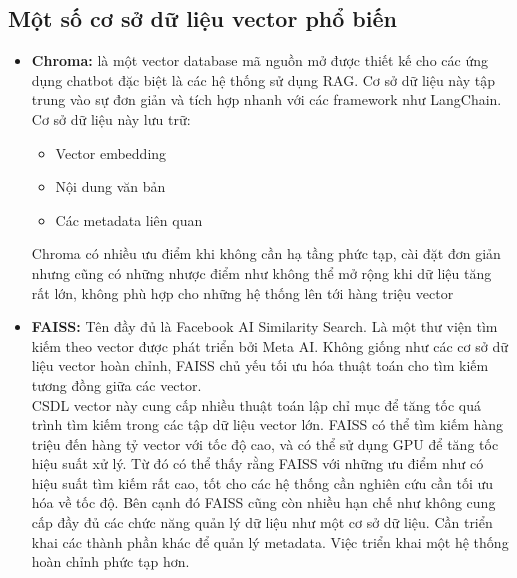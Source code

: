 \documentclass[../DoAn.tex]{subfiles}
\begin{document}
\subsection{Một số cơ sở dữ liệu vector phổ biến}
\begin{itemize}[label=-, leftmargin=*]
    \item \textbf{Chroma:} là một vector database mã nguồn mở được thiết kế cho các ứng dụng chatbot đặc biệt là các hệ thống sử dụng RAG. Cơ sở dữ liệu này tập trung vào sự đơn giản và tích hợp nhanh với các framework như LangChain. Cơ sở dữ liệu này lưu trữ:
          \begin{itemize} [label=+]
              \item Vector embedding
              \item Nội dung văn bản
              \item Các metadata liên quan
          \end{itemize}
          Chroma có nhiều ưu điểm khi không cần hạ tầng phức tạp, cài đặt đơn giản nhưng cũng có những nhược điểm như không thể mở rộng khi dữ liệu tăng rất lớn, không phù hợp cho những hệ thống lên tới hàng triệu vector

    \item  \textbf{FAISS:} Tên đầy đủ là Facebook AI Similarity Search. Là một thư viện tìm kiếm theo vector được phát triển bởi Meta AI. Không giống như các cơ sở dữ liệu vector hoàn chỉnh, FAISS chủ yếu tối ưu hóa thuật toán cho tìm kiếm tương đồng giữa các vector.\\
          \hspace*{2em}CSDL vector này cung cấp nhiều thuật toán lập chỉ mục để tăng tốc quá trình tìm kiếm trong các tập dữ liệu vector lớn. FAISS có thể tìm kiếm hàng triệu đến hàng tỷ vector với tốc độ cao, và có thể sử dụng GPU để tăng tốc hiệu suất xử lý. Từ đó có thể thấy rằng FAISS với những ưu điểm như có hiệu suất tìm kiếm rất cao, tốt cho các hệ thống cần nghiên cứu cần tối ưu hóa về tốc độ. Bên cạnh đó FAISS cũng còn nhiều hạn chế như không cung cấp đầy đủ các chức năng quản lý dữ liệu như một cơ sở dữ liệu. Cần triển khai các thành phần khác để quản lý metadata. Việc triển khai một hệ thống hoàn chỉnh phức tạp hơn.


\end{itemize}
\end{document}
